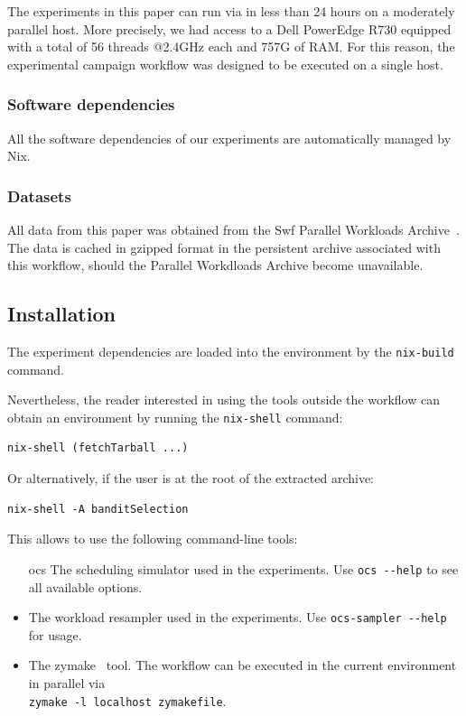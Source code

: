 \documentclass[sigconf,anonymous]{acmart}
\begin{document}
 The experiments in this paper can run via in less than 24 hours on a
 moderately parallel host. More precisely, we had access to a Dell PowerEdge
 R730 equipped with a total of 56 threads @2.4GHz each and 757G of RAM. For
 this reason, the experimental campaign workflow was designed to be executed on
 a single host.

\subsubsection{Software dependencies}

All the software dependencies of our experiments are automatically managed by Nix.

\subsubsection{Datasets}

All data from this paper was obtained from the Swf Parallel Workloads
Archive~\cite{Feitelson20142967}. The data is cached in gzipped format in the
persistent archive associated with this workflow, should the Parallel
Workdloads Archive become unavailable.

\subsection{Installation}

The experiment dependencies are loaded into the environment by the
\lstinline[basicstyle=\ttfamily]|nix-build| command.

Nevertheless, the reader interested in using the tools outside the workflow can
obtain an environment by running the
\lstinline[basicstyle=\ttfamily]|nix-shell| command:

\begin{lstlisting}
nix-shell (fetchTarball ...)
\end{lstlisting}

Or alternatively, if the user is at the root of the extracted archive:

\begin{lstlisting}
nix-shell -A banditSelection
\end{lstlisting}

This allows to use the following command-line tools:

\begin{itemize}

  \item[ocs] The scheduling simulator used in the experiments. Use
    \lstinline[basicstyle=\ttfamily]|ocs --help| to see all available options.

  \item[ocs-sampler] The workload resampler used in the experiments. Use
    \lstinline[basicstyle=\ttfamily]|ocs-sampler --help| for usage.

  \item[zymake] The zymake~\cite{zymake} tool.
    The workflow can be executed in the current environment in parallel
    via \\ \lstinline[basicstyle=\ttfamily]|zymake -l localhost zymakefile|.

\end{itemize}
\end{document}
